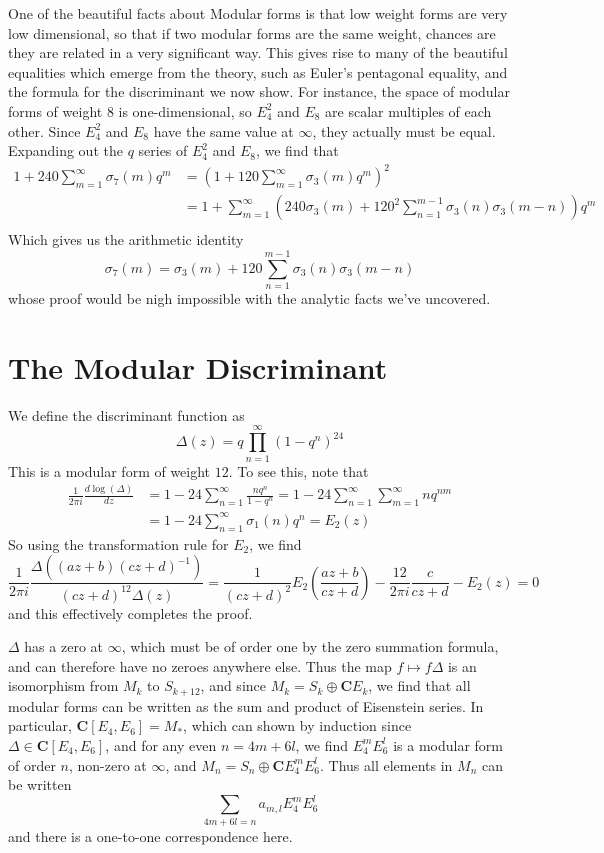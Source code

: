 One of the beautiful facts about Modular forms is that low weight forms are very low dimensional, so that if two modular forms are the same weight, chances are they are related in a very significant way. This gives rise to many of the beautiful equalities which emerge from the theory, such as Euler's pentagonal equality, and the formula for the discriminant we now show. For instance, the space of modular forms of weight 8 is one-dimensional, so $E_4^2$ and $E_8$ are scalar multiples of each other. Since $E_4^2$ and $E_8$ have the same value at $\infty$, they actually must be equal. Expanding out the $q$ series of $E_4^2$ and $E_8$, we find that
%
\begin{align*}
    1 + 240 \sum_{m = 1}^\infty \sigma_7(m) q^m &= \left( 1 + 120 \sum_{m = 1}^\infty \sigma_3(m) q^m \right)^2\\
    &= 1 + \sum_{m = 1}^\infty \left( 240 \sigma_3(m) + 120^2 \sum_{n = 1}^{m-1} \sigma_3(n) \sigma_3(m-n) \right) q^m\\
\end{align*}
%
Which gives us the arithmetic identity
%
\[ \sigma_7(m) = \sigma_3(m) + 120 \sum_{n = 1}^{m-1} \sigma_3(n) \sigma_3(m-n) \]
%
whose proof would be nigh impossible with the analytic facts we've uncovered.

\section{The Modular Discriminant}

We define the discriminant function as
%
\[ \Delta(z) = q \prod_{n = 1}^\infty (1 - q^n)^{24} \]
%
This is a modular form of weight $12$. To see this, note that
%
\begin{align*}
    \frac{1}{2 \pi i} \frac{d \log(\Delta)}{dz} &= 1  - 24 \sum_{n = 1}^\infty \frac{n q^n}{1 - q^n} = 1 - 24 \sum_{n = 1}^\infty \sum_{m = 1}^\infty n q^{nm}\\
    &= 1 - 24 \sum_{n = 1}^\infty \sigma_1(n) q^n = E_2(z)
\end{align*}
%
So using the transformation rule for $E_2$, we find
%
\[ \frac{1}{2 \pi i} \frac{\Delta((az + b)(cz + d)^{-1})}{(cz + d)^{12} \Delta(z)} = \frac{1}{(cz + d)^2} E_2 \left( \frac{az + b}{cz + d} \right) - \frac{12}{2 \pi i} \frac{c}{cz + d} - E_2(z) = 0 \]
%
and this effectively completes the proof.

$\Delta$ has a zero at $\infty$, which must be of order one by the zero summation formula, and can therefore have no zeroes anywhere else. Thus the map $f \mapsto f \Delta$ is an isomorphism from $M_k$ to $S_{k+12}$, and since $M_k = S_k \oplus \mathbf{C} E_k$, we find that all modular forms can be written as the sum and product of Eisenstein series. In particular, $\mathbf{C}[E_4,E_6] = M_*$, which can shown by induction since $\Delta \in \mathbf{C}[E_4,E_6]$, and for any even $n = 4m + 6l$, we find $E_4^m E_6^l$ is a modular form of order $n$, non-zero at $\infty$, and $M_n = S_n \oplus \mathbf{C} E_4^m E_6^l$. Thus all elements in $M_n$ can be written
%
\[ \sum_{4m + 6l = n} a_{m,l} E_4^m E_6^l \]
%
and there is a one-to-one correspondence here.

